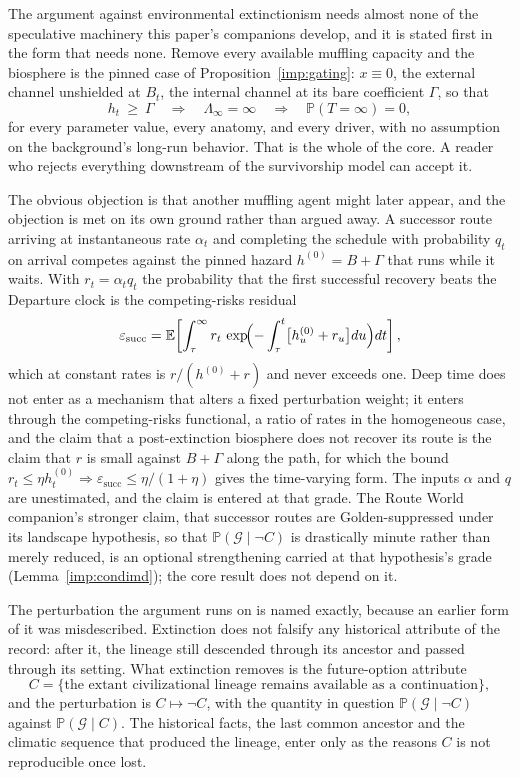 \documentclass[11pt]{article}
\newcommand{\E}{\mathbb{E}}
\newcommand{\PP}{\mathbb{P}}
\theoremstyle{plain}
\theoremstyle{definition}
\theoremstyle{remark}
\begin{document}
The argument against environmental extinctionism needs almost none of
the speculative machinery this paper's companions develop, and it is
stated first in the form that needs none. Remove every available
muffling capacity and the biosphere is the pinned case of
Proposition~\ref{imp:gating}: $x\equiv0$, the external channel
unshielded at $B_t$, the internal channel at its bare coefficient
$\Gamma$, so that
\[
h_t\ \ge\ \Gamma\quad\Longrightarrow\quad\Lambda_\infty=\infty
\quad\Longrightarrow\quad\PP(T=\infty)=0,
\]
for every parameter value, every anatomy, and every driver, with no
assumption on the background's long-run behavior. That is the whole of
the core. A reader who rejects everything downstream of the survivorship
model can accept it.

The obvious objection is that another muffling agent might later
appear, and the objection is met on its own ground rather than argued
away. A successor route arriving at instantaneous rate $\alpha_t$ and
completing the schedule with probability $q_t$ on arrival competes
against the pinned hazard $h^{(0)}=B+\Gamma$ that runs while it waits.
With $r_t=\alpha_tq_t$ the probability that the first successful
recovery beats the Departure clock is the competing-risks residual
\begin{equation}\label{eq:epssucc}
\varepsilon_{\mathrm{succ}}
=\E\!\left[\int_\tau^\infty r_t\,\exp\!\Bigl(-\int_\tau^t\bigl[h^{(0)}_u+r_u\bigr]du\Bigr)dt\right],
\end{equation}
which at constant rates is $r/(h^{(0)}+r)$ and never exceeds one. Deep
time does not enter as a mechanism that alters a fixed perturbation
weight; it enters through the competing-risks functional, a ratio of
rates in the homogeneous case, and the claim that a post-extinction
biosphere does not recover its route is the claim that $r$ is small
against $B+\Gamma$ along the path, for which the bound
$r_t\le\eta h^{(0)}_t\Rightarrow\varepsilon_{\mathrm{succ}}\le\eta/(1+\eta)$
gives the time-varying form. The inputs $\alpha$ and $q$ are
unestimated, and the claim is entered at that grade. The Route World
companion's stronger claim, that successor routes are Golden-suppressed
under its landscape hypothesis, so that $\PP(\mathcal G\mid\neg C)$ is
drastically minute rather than merely reduced, is an optional
strengthening carried at that hypothesis's grade
(Lemma~\ref{imp:condimd}); the core result does not depend on it.

The perturbation the argument runs on is named exactly, because an
earlier form of it was misdescribed. Extinction does not falsify any
historical attribute of the record: after it, the lineage still
descended through its ancestor and passed through its setting. What
extinction removes is the future-option attribute
\[
C=\{\text{the extant civilizational lineage remains available as a continuation}\},
\]
and the perturbation is $C\mapsto\neg C$, with the quantity in question
$\PP(\mathcal G\mid\neg C)$ against $\PP(\mathcal G\mid C)$. The
historical facts, the last common ancestor and the climatic sequence
that produced the lineage, enter only as the reasons $C$ is not
reproducible once lost.
\end{document}
